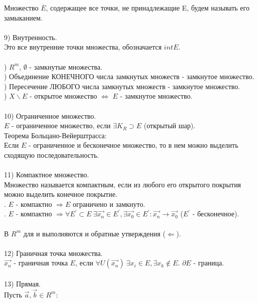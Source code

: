 \documentclass[12pt]{article}
\begin{document}
Множество $\overline{E}$, содержащее все точки, не принадлежащие E, будем называть его замыканием.\\
\\
9) Внутренность.\\
Это все внутренние точки множества, обозначается $int E$.\\
\\
) $R^m$, $\emptyset$ - замкнутые множества.\\
) Объединение КОНЕЧНОГО числа замкнутых множеств - замкнутое множество.\\
) Пересечение ЛЮБОГО числа замкнутых множеств - замкнутое множество.\\
) $X \backslash E$ - открытое множество $\iff$ $E$ - замкнутое множество.\\
\\
10) Ограниченное множество.\\
$E$ - ограниченное множество, если $\exists K_R \supset E$ (открытый шар).\\
Теорема Больцано-Вейерштрасса:\\
Если $E$ - ограниченное и бесконечное множество, то в нем можно выделить сходящую последовательность.\\
\\
11) Компактное множество.\\
Множество называется компактным, если из любого его открытого покрытия можно выделить конечное покрытие.\\
\indent {}. $E$ - компактно $\Rightarrow E$ ограничено и замкнуто.\\
\indent {}. $E$ - компактно $\Rightarrow \forall E^{'} \subset E \ \exists \overrightarrow{x_n} \in E^{'}, \exists \overrightarrow{x_0} \in E^{'} : \overrightarrow{x_n} \rightarrow \overrightarrow{x_0}$ ($E^{'}$ - бесконечное).\\
\\
В $R^m$ для  и  выполняются и обратные утверждения ($\Leftarrow$).\\
\\
12) Граничная точка множества.\\
$\overrightarrow{x_n}$ - граничная точка $E$, если $\forall U(\overrightarrow{x_n}) \ \exists x_i \in E, \exists x_k \notin E$. $\partial E$ - граница.\\
\\
13) Прямая.\\
Пусть $\overrightarrow{a}, \overrightarrow{b} \in R^m$:\\
\end{document}
